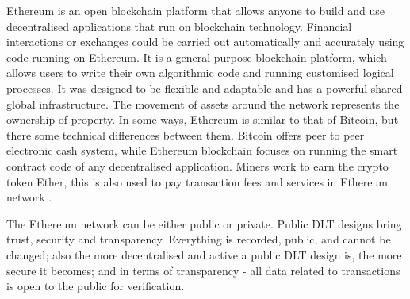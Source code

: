Ethereum \cite{ethereum} is an open blockchain platform that allows anyone to build and use decentralised applications that run on blockchain technology. Financial interactions or exchanges could be carried out automatically and accurately using code running on Ethereum. It is a general purpose blockchain platform, which allows users to write their own algorithmic code and running customised logical processes. It was designed to be flexible and adaptable and has a powerful shared global infrastructure. The movement of assets around the network represents the ownership of property. In some ways, Ethereum is similar to that of Bitcoin, but there some technical differences between them. Bitcoin offers peer to peer electronic cash system, while Ethereum blockchain focuses on running the smart contract code of any decentralised application. Miners work to earn the crypto token Ether, this is also used to pay transaction fees and services in Ethereum network \cite{hl_84}. 

The Ethereum network can be either public or private. Public DLT designs bring trust, security and transparency. Everything is recorded, public, and cannot be changed; also the more decentralised and active a public DLT design is, the more secure it becomes; and in terms of transparency - all data related to transactions is open to the public for verification.
